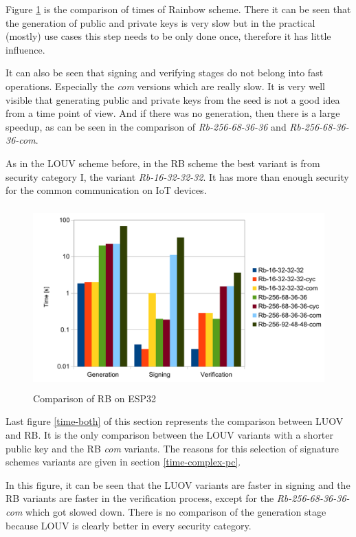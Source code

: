 \documentclass[thesis=M,english]{FITthesis}[2019/12/23]
\begin{document}
\noindent
Figure \ref{time-rb} is the comparison of times of Rainbow scheme. There it can be seen that the generation of public and private keys is very slow but in the practical (mostly) use cases this step needs to be only done once, therefore it has little influence. 

\bigskip
\noindent
It can also be seen that signing and verifying stages do not belong into fast operations. Especially the \textit{com} versions which are really slow. It is very well visible that generating public and private keys from the seed is not a good idea from a time point of view. And if there was no generation, then there is a large speedup, as can be seen in the comparison of \textit{Rb-256-68-36-36} and \textit{Rb-256-68-36-36-com}.

\bigskip
\noindent
As in the LOUV scheme before, in the RB scheme the best variant is from security category I, the variant \textit{Rb-16-32-32-32}. It has more than enough security for the common communication on IoT devices. 

\begin{figure}[H]
\centering
\includegraphics[width=13cm,height=7cm]{images/time-rb.pdf}
\caption{Comparison of RB on ESP32}
\label{time-rb}
\end{figure}

\noindent
Last figure \ref{time-both} of this section represents the comparison between LUOV and RB. It is the only comparison between the LOUV variants with a shorter public key and the RB \textit{com} variants. The reasons for this selection of signature schemes variants are given in section \ref{time-complex-pc}.

\bigskip
\noindent
In this figure, it can be seen that the LUOV variants are faster in signing and the RB variants are faster in the verification process, except for the \textit{Rb-256-68-36-36-com} which got slowed down. There is no comparison of the generation stage because LOUV is clearly better in every security category. 
\end{document}
